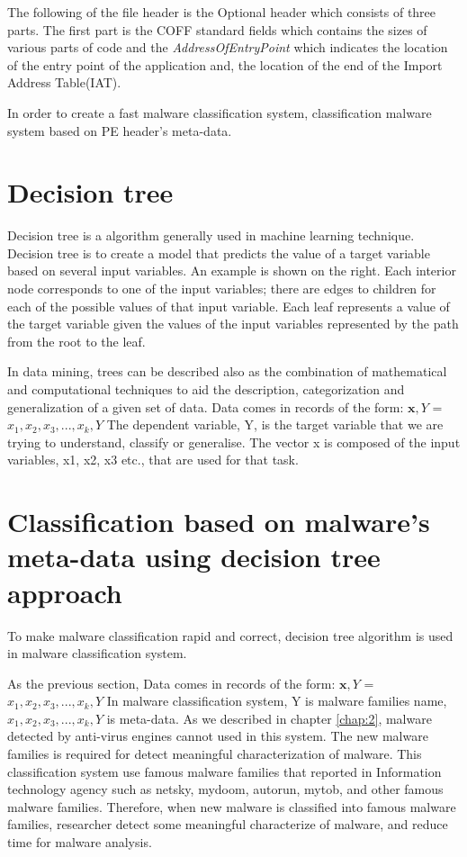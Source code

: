 The following of the file header is the Optional header which consists of three parts. The first part is the COFF standard fields which contains the sizes of various parts of code and the \emph{AddressOfEntryPoint} which indicates the location of the entry point of the application and, the location of the end of the Import Address Table(IAT).

In order to create a fast malware classification system, classification malware system based on PE header's meta-data.

\section{Decision tree\cite{wikipedia}}
Decision tree is a algorithm generally used in machine learning technique. Decision tree is to create a model that predicts the value of a target variable based on several input variables. An example is shown on the right. Each interior node corresponds to one of the input variables; there are edges to children for each of the possible values of that input variable. Each leaf represents a value of the target variable given the values of the input variables represented by the path from the root to the leaf.

In data mining, trees can be described also as the combination of mathematical and computational techniques to aid the description, categorization and generalization of a given set of data.
Data comes in records of the form:
\(\textbf{x},Y\) = \(x_1, x_2, x_3, ..., x_k, Y\)
The dependent variable, Y, is the target variable that we are trying to understand, classify or generalise. The vector x is composed of the input variables, x1, x2, x3 etc., that are used for that task.
\section{Classification based on malware's meta-data using decision tree approach}
To make malware classification rapid and correct, decision tree algorithm is used in malware classification system.

As the previous section, Data comes in records of the form:
\(\textbf{x},Y\) = \(x_1, x_2, x_3, ..., x_k, Y\)
In malware classification system, Y is malware families name, \(x_1, x_2, x_3, ..., x_k, Y\) is meta-data. As we described in chapter \ref{chap:2}, malware detected by anti-virus engines cannot used in this system. The new malware families is required for detect meaningful characterization of malware. This classification system use famous malware families that reported in Information technology agency such as netsky, mydoom, autorun, mytob, and other famous malware families. Therefore, when new malware is classified into famous malware families, researcher detect some meaningful characterize of malware, and reduce time for malware analysis. 

